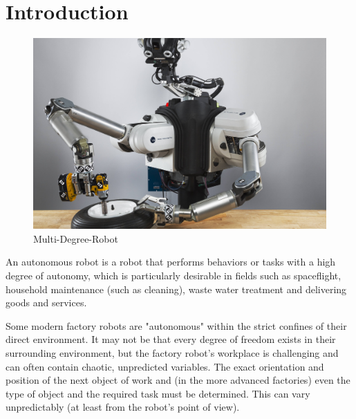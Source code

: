 \documentclass[11pt]{report}
\begin{document}
	\newpage
	\tableofcontents
		
	
	\newpage
	
	
	\newpage
	\chapter{ Introduction}
		\begin{figure}[H]
			\begin{center}
				\includegraphics[scale = 0.19]{Ch1-Introduction/Multi-Degree-Robot.jpg}
				\caption{Multi-Degree-Robot}
				\label{fig:Multi-Degree-Robot}
			\end{center}
		\end{figure}
		An autonomous robot is a robot that performs behaviors or tasks with a high degree of autonomy, which is particularly desirable in fields such as spaceflight, household maintenance (such as cleaning), waste water treatment and delivering goods and services.
		
		Some modern factory robots are "autonomous" within the strict confines of their direct environment. It may not be that every degree of freedom exists in their surrounding environment, but the factory robot's workplace is challenging and can often contain chaotic, unpredicted variables. The exact orientation and position of the next object of work and (in the more advanced factories) even the type of object and the required task must be determined. This can vary unpredictably (at least from the robot's point of view).
\end{document}
